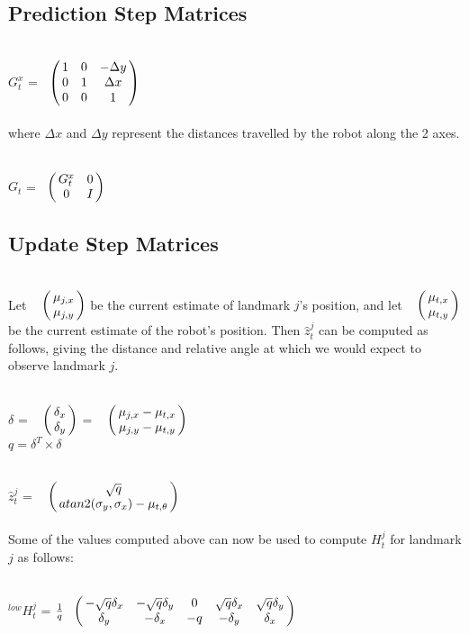 \documentclass{ba-kecs}
\numberwithin{figure}{section}
\numberwithin{equation}{section}
\begin{document}
{\subsection{Prediction Step Matrices}
$G_t^x$ = 
$\bordermatrix{ 	& \cr
                 &1 & 0 & -\Delta y \cr
                 &0 & 1 & \Delta x \cr
                 &0 & 0 & 1 \cr}$ \\ \\
where $\Delta x$ and $\Delta y$ represent the distances travelled by the robot along the 2 axes.

$G_t$ = 
$\bordermatrix{ 	& \cr
                 &G_t^x & 0 \cr
                 &0 & I \cr}$
                 
\subsection{Update Step Matrices}
Let $\bordermatrix{~ \cr
                        & \mu_{j,x} \cr
                        & \mu_{j,y}}$
be the current estimate of landmark $j$'s position, and let $\bordermatrix{~ \cr
                        & \mu_{t,x} \cr
                        & \mu_{t,y}}$
be the current estimate of the robot's position. Then $\hat{z}^j_t$ can be computed as follows, giving the distance and relative angle at which we would expect to observe landmark $j$.
                        
$\delta$ = $\bordermatrix{~ \cr
                        & \delta_{x} \cr
                        & \delta_{y}}$ = $\bordermatrix{~ \cr
                                                                                                & \mu_{j,x} - \mu_{t,x} \cr
                                                                & \mu_{j,y} - \mu_{t,y} \cr}$ \\

$q = \delta^{T} \times \delta$

$\hat{z}^{j}_{t}$ = $\bordermatrix{~ \cr
                        & \sqrt{q} \cr
                        & atan2(\sigma_{y},\sigma_{x}) - \mu_{t,\theta}}$ \\ \\
Some of the values computed above can now be used to compute $H^{j}_{t}$ for landmark $j$ as follows:
                                                  
$^{low}H^{j}_{t}$ = $\frac{1}{q} \bordermatrix{~ \cr
                                & -\sqrt{q} \delta_{x} & -\sqrt{q} \delta_{y} & 0 & \sqrt{q} \delta_{x} & \sqrt{q} \delta_{y} \cr
                                & \delta_{y} & -\delta_{x} & -q & -\delta_{y} & \delta_{x}} $\\
                                
}
\end{document}
